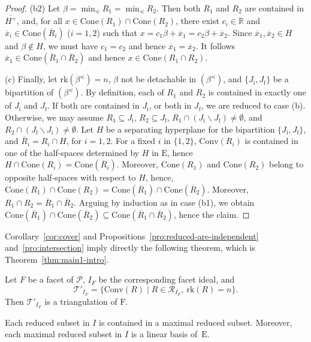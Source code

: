 \documentclass[ALCO,published]{cedram}
\newcommand\pol{\mathcal P}
\theoremstyle{plain}
\newcommand\nl{\par\noindent}
\newcommand\ov{\overline}
\newcommand\mc{\mathcal}
\newcommand\smeno{\smallsetminus}
\newcommand\real{\mathbb R}
\newcommand\pol{\mathcal P}
\newcommand\conv{\mathrm{Conv}}
\newcommand\cone{\mathrm{Cone}}
\newcommand\rk{\mathrm{rk}}
\newcommand\be{\beta}
\newcommand\preq{\preccurlyeq}
\begin{document}
\begin{proof}
(b2) Let $\be=\min_\preq R_1=\min_\preq R_2$. 
Then both $R_1$ and $R_2$ are contained in $\ov {H^+}$, 
and, for all $x\in \cone(R_1)\cap\cone(R_2)$, there exist $c_i\in \real$ and $\ov x_i\in \cone(\ov R_i)$ ($i=1, 2$) such that  $x=c_1\be+\ov x_1=c_2\be +\ov x_2$.
Since $\ov x_1, \ov x_2\in H$ and $\be\not\in H$, we must have  $c_1=c_2$ and hence $\ov x_1=\ov x_2$. 
It follows  $\ov x_1\in \cone (\ov R_1\cap \ov R_2)$ and  hence $x\in \cone (R_1\cap R_2)$.

(c) Finally, let $\rk(\be^\preq)=n$, $\be$ not be detachable in  $(\be^\preq)$, and  $\{J_{\mathrm i}, J_{\mathrm f}\}$  be a bipartition of $(\be^\preq)$. 
By definition, each of $R_1$ and $R_2$ is contained in exactly one of $J_{\mathrm i}$ and $J_{\mathrm f}$. 
If both are contained in $J_{\mathrm i}$, or both in $J_{\mathrm f}$, we are reduced to case (b). 
Otherwise, we may assume $R_1\subseteq J_{\mathrm i}$, $R_2\subseteq J_{\mathrm f}$, $R_1\cap  (J_{\mathrm i}\smeno J_{\mathrm f})\neq \emptyset$, and $R_2\cap  (J_{\mathrm f}\smeno J_{\mathrm i})\neq \emptyset$. 
Let $H$ be a separating hyperplane for the bipartition $\{J_{\mathrm i}, J_{\mathrm f}\}$, and $\ov R_i=R_i\cap H$, for $i=1,2$. 
For a fixed $i$ in $\{1,2\}$, $\conv(R_i)$ is contained in one of the half-spaces determined by $H$ in $\mathrm E$, hence  $H\cap\cone(R_i)=\cone (\ov R_i)$. 
Moreover,  $\cone(R_1)$ and $\cone(R_2)$  belong to opposite half-spaces with respect to $H$, hence, $\cone(R_1)\cap \cone(R_2)=\cone (\ov R_1)\cap\cone( \ov R_2)$. 
Moreover, $R_1\cap R_2=\ov R_1\cap \ov R_2$.  
Arguing by induction as in case  (b1), we obtain $\cone (\ov R_1)\cap\cone( \ov R_2)\subseteq \cone (\ov R_1\cap \ov R_2)$, hence the claim.
\end{proof}

Corollary~\ref{cor:cover} and Propositions~\ref{pro:reduced-are-independent} and~\ref{pro:intersection} imply directly the following theorem, which is Theorem~\ref{thm:main1-intro}.

\begin{thm}\label{thm:main1}
Let $F$ be a facet of $\pol$, $I_F$ be the corresponding facet ideal, and 
$$
\mc T'_{I_F}=\{\conv(R) \mid R\in \mc R_{I_F},\ \rk(R)=n\}.
$$
Then $\mc T'_{I_F}$ is a triangulation of $\mathrm F$. 
\end{thm}

\begin{cor}
Each reduced subset in $I$ is  contained in a maximal reduced subset.
Moreover, each maximal reduced subset in $I$ is a linear basis of~$\mathrm E$. 
\end{cor}
\end{document}

